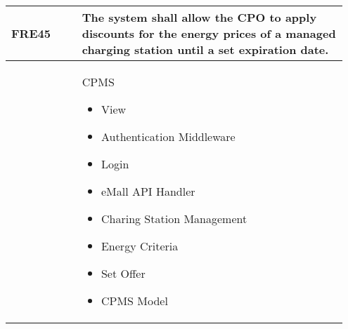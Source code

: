 {\begin{longtable}{|p{0.20\linewidth}p{0.75\linewidth} |}
    \hline
    \rowcolor{bluepoli!15} FRE45 &  The system shall allow the CPO to apply discounts for the energy prices of a managed charging station until a set expiration date.\\
    \hline
    \rowcolor{bluepoli!5}  & CPMS  \newline
    \begin{itemize}
        \item View
        \item Authentication Middleware
        \item Login
        \item eMall API Handler
        \item Charing Station Management
        \item Energy Criteria
        \item Set Offer
        \item CPMS Model
    \end{itemize} \\
    \hline
\end{longtable}}
